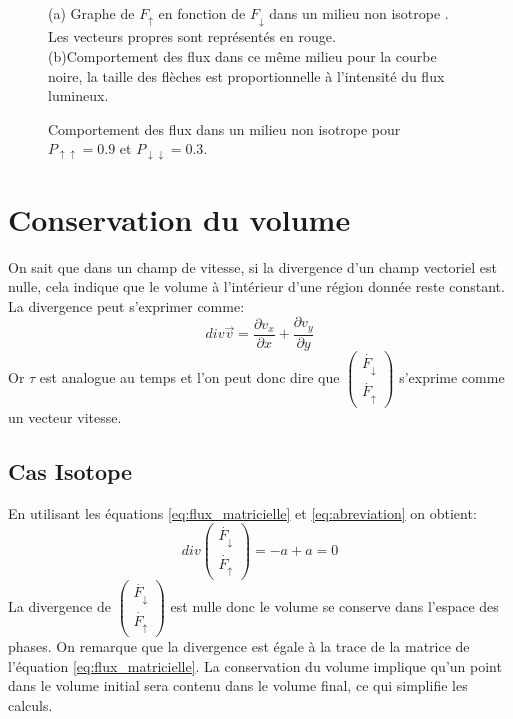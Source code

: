 \documentclass[12pt]{article}
\begin{document}
\begin{figure}[H]
\begin{subfigure}{0.335\textwidth}
        \captionsetup{width=1\textwidth}
        \caption{} 
        \label{schéma:non.iso}
    \end{subfigure}
    \caption{Comportement des flux dans un milieu non isotrope pour $P_{\uparrow\uparrow}=0.9$ et $P_{\downarrow\downarrow}=0.3$.}
    \label{fig:non.iso}
    \justifying \noindent
    (a) Graphe de $F_{\uparrow}$ en fonction de $F_{\downarrow}$ dans un milieu non isotrope . Les vecteurs propres sont représentés en rouge.\\(b)Comportement des flux dans ce même milieu pour la courbe noire, la taille des flèches est proportionnelle à l'intensité du flux lumineux.
\end{figure}


\section{Conservation du volume}
On sait que dans un champ de vitesse, si la divergence d'un champ vectoriel est nulle, cela indique que le volume à l'intérieur d'une région donnée reste constant. La divergence peut s'exprimer comme:
\begin{equation}
    div \overrightarrow v =\frac{\partial {v_x}}{\partial x}+\frac{\partial {v_y}}{\partial y}
\end{equation}
Or $\tau$ est analogue au temps et l’on peut donc dire que $\begin{pmatrix}
        \dot{F_{\downarrow}} \\
        \dot{F_{\uparrow}}
    \end{pmatrix}$ s'exprime comme un vecteur vitesse. 
\subsection{Cas Isotope}    
    En utilisant les équations \ref{eq:flux_matricielle} et \ref{eq:abreviation} on obtient:
    \begin{equation}
        div\begin{pmatrix}
        \dot{F_{\downarrow}} \\
        \dot{F_{\uparrow}}
    \end{pmatrix}=-a+a=0
    \end{equation}
La divergence de $\begin{pmatrix}
        \dot{F_{\downarrow}} \\
        \dot{F_{\uparrow}}
    \end{pmatrix}$ est nulle donc le volume se conserve dans l'espace des phases. On remarque que la divergence est égale à la trace de la matrice de l'équation \ref{eq:flux_matricielle}. La conservation du volume implique qu'un point dans le volume initial sera contenu dans le volume final, ce qui simplifie les calculs.
\end{document}
